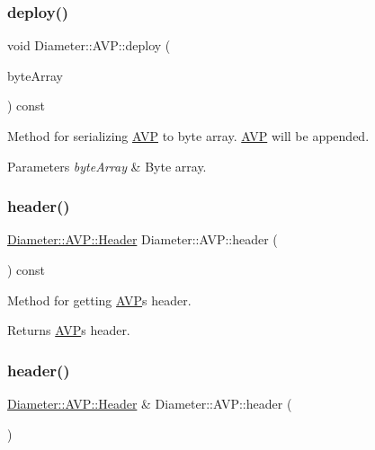 \subsubsection{\texorpdfstring{deploy()}{deploy()}\hspace{0.1cm}{\footnotesize\ttfamily [2/2]}}
{\footnotesize\ttfamily void Diameter\+::\+A\+V\+P\+::deploy (\begin{DoxyParamCaption}\item[{Byte\+Array \&}]{byte\+Array }\end{DoxyParamCaption}) const}



Method for serializing \hyperlink{classDiameter_1_1AVP}{A\+VP} to byte array. \hyperlink{classDiameter_1_1AVP}{A\+VP} will be appended. 


\begin{DoxyParams}{Parameters}
{\em byte\+Array} & Byte array. \\
\hline
\end{DoxyParams}
\mbox{\label{classDiameter_1_1AVP_aa968a1e25c2b83df6ea774d67534320b}} 
\subsubsection{\texorpdfstring{header()}{header()}\hspace{0.1cm}{\footnotesize\ttfamily [1/2]}}
{\footnotesize\ttfamily \hyperlink{classDiameter_1_1AVP_1_1Header}{Diameter\+::\+A\+V\+P\+::\+Header} Diameter\+::\+A\+V\+P\+::header (\begin{DoxyParamCaption}{ }\end{DoxyParamCaption}) const}



Method for getting \hyperlink{classDiameter_1_1AVP}{A\+VP}\textquotesingle{}s header. 

\begin{DoxyReturn}{Returns}
\hyperlink{classDiameter_1_1AVP}{A\+VP}\textquotesingle{}s header. 
\end{DoxyReturn}
\mbox{\label{classDiameter_1_1AVP_a9636f4defd3f7f65b807940658eda3b4}} 
\subsubsection{\texorpdfstring{header()}{header()}\hspace{0.1cm}{\footnotesize\ttfamily [2/2]}}
{\footnotesize\ttfamily \hyperlink{classDiameter_1_1AVP_1_1Header}{Diameter\+::\+A\+V\+P\+::\+Header} \& Diameter\+::\+A\+V\+P\+::header (\begin{DoxyParamCaption}{ }\end{DoxyParamCaption})}



